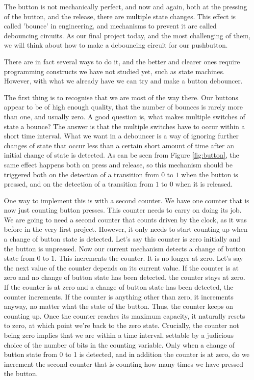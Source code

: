 \documentclass[../physical_computing.tex]{subfiles}
\begin{document}
The button is not mechanically perfect, and now and again, both at the pressing of the button, and the release, there are multiple state changes. This effect is called 'bounce' in engineering, and mechanisms to prevent it are called debouncing circuits. As our final project today, and the most challenging of them, we will think about how to make a debouncing circuit for our pushbutton.

There are in fact several ways to do it, and the better and clearer ones require programming constructs we have not studied yet, such as state machines. However, with what we already have we can try and make a button debouncer.

The first thing is to recognise that we are most of the way there. Our buttons appear to be of high enough quality, that the number of bounces is rarely more than one, and usually zero. A good question is, what makes multiple switches of state a bounce? The answer is that the multiple switches have to occur within a short time interval. What we want in a debouncer is a way of ignoring further changes of state that occur less than a certain short amount of time after an initial change of state is detected. As can be seen from Figure \ref{fig:button}, the same effect happens both on press and release, so this mechanism should be triggered both on the detection of a transition from $0$ to $1$ when the button is pressed, and on the detection of a transition from $1$ to $0$ when it is released. 

One way to implement this is with a second counter. We have one counter that is now just counting button presses. This counter needs to carry on doing its job. We are going to need a second counter that counts driven by the clock, as it was before in the very first project. However, it only needs to start counting up when a change of button state is detected. Let's say this counter is zero initially and the button is unpressed. Now our current mechanism detects a change of button state from $0$ to $1$. This increments the counter. It is no longer at zero. Let's say the next value of the counter depends on its current value. If the counter is at zero and no change of button state has been detected, the counter stays at zero. If the counter is at zero and a change of button state has been detected, the counter increments. If the counter is anything other than zero, it increments anyway, no matter what the state of the button. Thus, the counter keeps on counting up. Once the counter reaches its maximum capacity, it naturally resets to zero, at which point we're back to the zero state. Crucially, the counter not being zero implies that we are within a time interval, settable by a judicious choice of the number of bits in the counting variable. Only when a change of button state from 0 to 1 is detected, and in addition the counter is at zero, do we increment the second counter that is counting how many times we have pressed the button.
\end{document}
